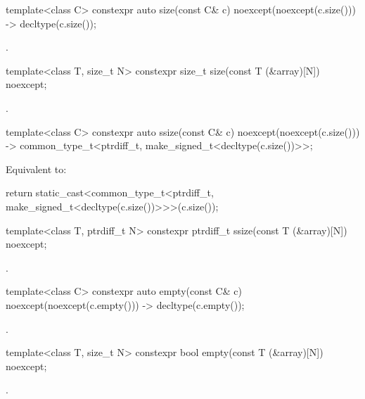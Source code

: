 %
\begin{itemdecl}
template<class C> constexpr auto size(const C& c) noexcept(noexcept(c.size()))
  -> decltype(c.size());
\end{itemdecl}
\begin{itemdescr}
\pnum
\returns
{}.
\end{itemdescr}

%
\begin{itemdecl}
template<class T, size_t N> constexpr size_t size(const T (&array)[N]) noexcept;
\end{itemdecl}
\begin{itemdescr}
\pnum
\returns
{}.
\end{itemdescr}

%
\begin{itemdecl}
template<class C> constexpr auto ssize(const C& c) noexcept(noexcept(c.size()))
  -> common_type_t<ptrdiff_t, make_signed_t<decltype(c.size())>>;
\end{itemdecl}
\begin{itemdescr}
\pnum
\effects
Equivalent to:
\begin{codeblock}
return static_cast<common_type_t<ptrdiff_t, make_signed_t<decltype(c.size())>>>(c.size());
\end{codeblock}
\end{itemdescr}

%
\begin{itemdecl}
template<class T, ptrdiff_t N> constexpr ptrdiff_t ssize(const T (&array)[N]) noexcept;
\end{itemdecl}
\begin{itemdescr}
\pnum
\returns
{}.
\end{itemdescr}

%
\begin{itemdecl}
template<class C> constexpr auto empty(const C& c) noexcept(noexcept(c.empty()))
  -> decltype(c.empty());
\end{itemdecl}
\begin{itemdescr}
\pnum
\returns
{}.
\end{itemdescr}

%
\begin{itemdecl}
template<class T, size_t N> constexpr bool empty(const T (&array)[N]) noexcept;
\end{itemdecl}
\begin{itemdescr}
\pnum
\returns
{}.
\end{itemdescr}

